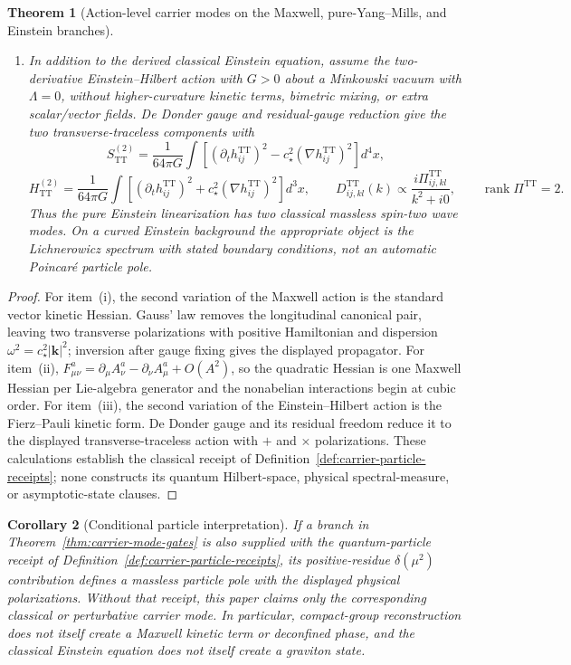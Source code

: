 \documentclass[11pt]{article}
\newtheorem{theorem}{Theorem}[section]
\newtheorem{corollary}[theorem]{Corollary}
\begin{document}
\begin{theorem}[Action-level carrier modes on the Maxwell, pure-Yang--Mills, and Einstein branches]
\begin{enumerate}[label=\textup{(\roman*)},leftmargin=2em]
\item In addition to the derived classical Einstein equation, assume the two-derivative
Einstein--Hilbert action with \(G>0\) about a Minkowski vacuum with \(\Lambda=0\), without higher-curvature
kinetic terms, bimetric mixing, or extra scalar/vector fields. De Donder gauge and residual-gauge
reduction give the two transverse-traceless components with
\[
S_{\mathrm{TT}}^{(2)}
=\frac{1}{64\pi G}\int
\left[(\partial_t h_{ij}^{\mathrm{TT}})^2
-c_\star^2(\nabla h_{ij}^{\mathrm{TT}})^2\right]d^4x,
\]
\[
H_{\mathrm{TT}}^{(2)}
=\frac{1}{64\pi G}\int
\left[(\partial_t h_{ij}^{\mathrm{TT}})^2
+c_\star^2(\nabla h_{ij}^{\mathrm{TT}})^2\right]d^3x,
\qquad
D^{\mathrm{TT}}_{ij,kl}(k)
\propto\frac{i\Pi^{\mathrm{TT}}_{ij,kl}}{k^2+i0},
\qquad \operatorname{rank}\Pi^{\mathrm{TT}}=2.
\]
Thus the pure Einstein linearization has two classical massless spin-two wave modes. On a curved
Einstein background the appropriate object is the Lichnerowicz spectrum with stated boundary
conditions, not an automatic Poincar\'e particle pole.
\end{enumerate}
\end{theorem}

\begin{proof}
For item~\textup{(i)}, the second variation of the Maxwell action is the standard vector kinetic
Hessian. Gauss' law removes the longitudinal canonical pair, leaving two transverse polarizations
with positive Hamiltonian and dispersion \(\omega^2=c_\star^2|\mathbf k|^2\); inversion after
gauge fixing gives the displayed propagator. For item~\textup{(ii)},
\(F^a_{\mu\nu}=\partial_\mu A^a_\nu-\partial_\nu A^a_\mu+O(A^2)\), so the quadratic Hessian is
one Maxwell Hessian per Lie-algebra generator and the nonabelian interactions begin at cubic
order. For item~\textup{(iii)}, the second variation of the Einstein--Hilbert action is the
Fierz--Pauli kinetic form. De Donder gauge and its residual freedom reduce it to the displayed
transverse-traceless action with \(+\) and \(\times\) polarizations. These calculations establish
the classical receipt of Definition~\ref{def:carrier-particle-receipts}; none constructs its
quantum Hilbert-space, physical spectral-measure, or asymptotic-state clauses.
\end{proof}

\begin{corollary}[Conditional particle interpretation]
\label{cor:conditional-carrier-particles}
If a branch in Theorem~\ref{thm:carrier-mode-gates} is also supplied with the quantum-particle
receipt of Definition~\ref{def:carrier-particle-receipts}, its positive-residue
\(\delta(\mu^2)\) contribution defines a massless particle pole with the displayed physical
polarizations. Without that receipt, this paper claims only the corresponding classical or
perturbative carrier mode. In particular, compact-group reconstruction does not itself create a
Maxwell kinetic term or deconfined phase, and the classical Einstein equation does not itself
create a graviton state.
\end{corollary}
\end{document}
